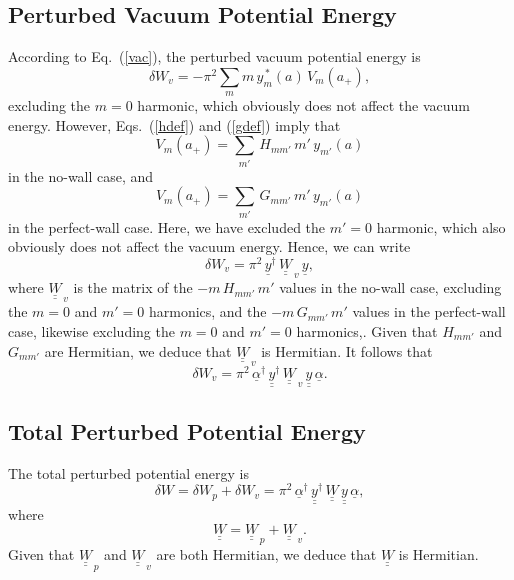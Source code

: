 \documentclass[12pt,prb,aps]{revtex4-1}
\begin{document}
\subsection{Perturbed Vacuum Potential Energy}
According to Eq.~(\ref{vac}), the perturbed vacuum potential energy is
\begin{equation}
\delta W_v = - \pi^2\sum_m m\,y_m^{\,\ast}(a)\,V_m(a_+),
\end{equation}
excluding the $m=0$ harmonic, which 
obviously does not affect the vacuum energy. 
However, Eqs.~(\ref{hdef}) and (\ref{gdef}) imply that
\begin{equation}
V_m(a_+) = \sum_{m'}\,H_{mm'}\,m'\,y_{m'}(a)
\end{equation}
in the no-wall case, and 
\begin{equation}
V_m(a_+) = \sum_{m'}\,G_{mm'}\,m'\,y_{m'}(a)
\end{equation}
in the perfect-wall case. Here, we have excluded the $m'=0$ harmonic, which also obviously does not affect the vacuum energy. 
Hence, we can write
\begin{equation}
\delta W_v = \pi^2\,\underline{y}^\dag\,\underline{\underline{W}}_{\,v}\,\underline{y},
\end{equation}
where $\underline{\underline{W}}_{\,v}$ is the matrix of the $-m\,H_{mm'}\,m'$ values in the no-wall case, excluding the $m=0$ and $m'=0$ harmonics, and the
$-m\,G_{mm'}\,m'$ values in the perfect-wall case, likewise  excluding the $m=0$ and $m'=0$ harmonics,. Given that $H_{mm'}$ and $G_{mm'}$ are Hermitian, we deduce that $\underline{\underline{W}}_{\,v}$ 
is Hermitian. It follows that
\begin{equation}
\delta W_v = \pi^2\,\underline{\alpha}^\dag\,\underline{\underline{y}}^\dag\,\underline{\underline{W}}_{\,v}\,\underline{\underline{y}}\,\underline{\alpha}.
\end{equation}

\subsection{Total Perturbed Potential Energy}
The total perturbed potential energy is
\begin{equation}
\delta W = \delta W_p + \delta W_v = \pi^2\,\underline{\alpha}^\dag\,\underline{\underline{y}}^\dag\,\underline{\underline{W}}\,\underline{\underline{y}}\,\underline{\alpha},
\end{equation}
where 
\begin{equation}
\underline{\underline{W}} = \underline{\underline{W}}_{\,p} + \underline{\underline{W}}_{\,v}.
\end{equation}
Given that $\underline{\underline{W}}_{\,p}$ and $\underline{\underline{W}}_{\,v}$ are both Hermitian, we deduce that $\underline{\underline{W}}$ is Hermitian.
\end{document}
